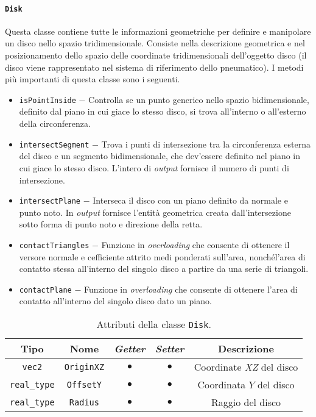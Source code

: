 \paragraph{\texttt{Disk}}
Questa classe contiene tutte le informazioni geometriche per definire e manipolare un disco nello spazio tridimensionale. Consiste nella descrizione geometrica e nel posizionamento dello spazio delle coordinate tridimensionali dell'oggetto disco (il disco viene rappresentato nel sistema di riferimento dello pneumatico). I metodi più importanti di questa classe sono i seguenti.
\begin{itemize}
	\item \texttt{isPointInside} $-$ Controlla se un punto generico nello spazio bidimensionale, definito dal piano in cui giace lo stesso disco, si trova all'interno o all'esterno della circonferenza.
	\item \texttt{intersectSegment} $-$ Trova i punti di intersezione tra la circonferenza esterna del disco e un segmento bidimensionale, che dev'essere definito nel piano in cui giace lo stesso disco. L'intero di \textit{output} fornisce il numero di punti di intersezione.
	\item \texttt{intersectPlane} $-$ Interseca il disco con un piano definito da normale e punto noto. In \textit{output} fornisce l'entità geometrica creata dall'intersezione sotto forma di punto noto e direzione della retta.
	\item \texttt{contactTriangles} $-$ Funzione in \textit{overloading} che consente di ottenere il versore normale e cefficiente attrito medi ponderati sull'area, nonchél'area di contatto stessa all'interno del singolo disco a partire da una serie di triangoli.
	\item \texttt{contactPlane} $-$ Funzione in \textit{overloading} che consente di ottenere l'area di contatto all'interno del singolo disco dato un piano.
\end{itemize}
\begin{table}[h!]
	\centering
	\begin{tabular}{|c|c|c|c|c|}
		\hline 
		\textbf{Tipo} & \textbf{Nome} & \textit{\textbf{Getter}} & \textit{\textbf{Setter}} & \textbf{Descrizione} \\ \hline 
		\texttt{vec2} & \texttt{OriginXZ} & $\bullet$ & $\bullet$ & Coordinate \textit{XZ} del disco \\ \hline 
		\texttt{real\_type} & \texttt{OffsetY} & $\bullet$ & $\bullet$ & Coordinata $Y$ del disco \\ \hline
		\texttt{real\_type} & \texttt{Radius} & $\bullet$ & $\bullet$ & Raggio del disco \\ \hline
	\end{tabular}
	\caption{Attributi della classe \texttt{Disk}.}
	\label{}
\end{table}
%
